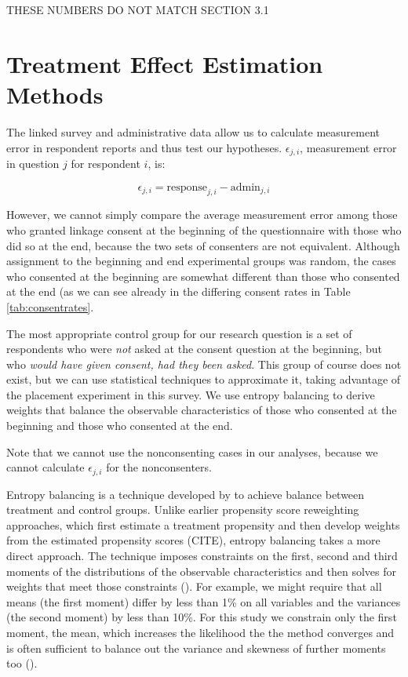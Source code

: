 THESE NUMBERS DO NOT MATCH SECTION 3.1


\section{Treatment Effect Estimation Methods}\label{method}

The linked survey and administrative data allow us to calculate measurement error in respondent reports and thus test our hypotheses. $\epsilon_{j,i}$,  measurement error in question $j$ for respondent $i$, is:

\begin{equation}
\epsilon_{j,i} = \text{response}_{j,i} - \text{admin}_{j,i}
\label{eq:hyp_epsi}
\end{equation}

However, we cannot simply compare the average measurement error among those who granted linkage consent at the beginning of the questionnaire with those who did so at the end, because the two sets of consenters are not equivalent.  Although assignment to the beginning and end experimental groups was random, the cases who consented at the beginning are somewhat different than those who consented at the end (as we can see already in the differing consent rates in Table \ref{tab:consentrates}. 

The most appropriate control group for our research question is a set of respondents who were \textit{not} asked at the consent question at the beginning, but who \textit{would have given consent, had they been asked}. This group of course does not exist, but we can use statistical techniques to approximate it, taking advantage of the placement experiment in this survey. We use entropy balancing to derive weights that balance the observable characteristics of those who consented at the beginning and those who consented at the end. 

Note that we cannot use the nonconsenting cases in our analyses, because we cannot calculate $\epsilon_{j,i}$ for the nonconsenters.

Entropy balancing is a technique developed by \cite{Hainmueller12} to achieve balance between treatment and control groups. Unlike earlier propensity score reweighting approaches, which first estimate a treatment propensity and then develop weights from the estimated propensity scores (CITE), entropy balancing takes a more direct approach. The technique imposes constraints on the first, second and third moments of the distributions of the observable characteristics and then solves for weights that meet those constraints (\cite{Hainmueller12}). For example, we might require that all means (the first moment) differ by less than 1\% on all variables and the variances (the second moment) by less than 10\%. For this study we constrain only the first moment, the mean, which increases the likelihood the the method converges and is often sufficient to balance out the variance and skewness of further moments too (\cite{Hainmuelleretal13}).

